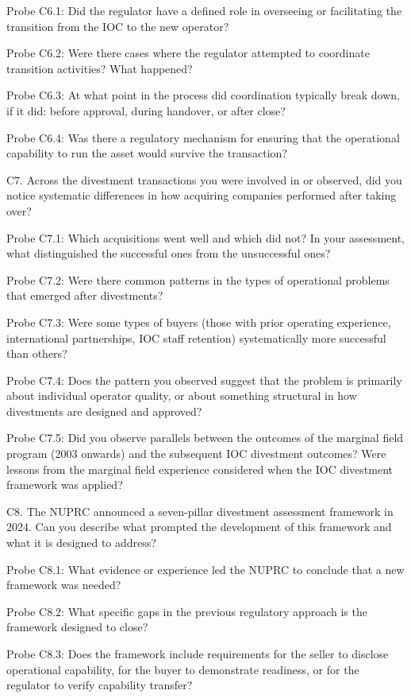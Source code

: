 Probe C6.1: Did the regulator have a defined role in overseeing or
facilitating the transition from the IOC to the new operator?

Probe C6.2: Were there cases where the regulator attempted to coordinate
transition activities? What happened?

Probe C6.3: At what point in the process did coordination typically
break down, if it did: before approval, during handover, or after close?

Probe C6.4: Was there a regulatory mechanism for ensuring that the
operational capability to run the asset would survive the transaction?

C7. Across the divestment transactions you were involved in or observed,
did you notice systematic differences in how acquiring companies
performed after taking over?

Probe C7.1: Which acquisitions went well and which did not? In your
assessment, what distinguished the successful ones from the unsuccessful
ones?

Probe C7.2: Were there common patterns in the types of operational
problems that emerged after divestments?

Probe C7.3: Were some types of buyers (those with prior operating
experience, international partnerships, IOC staff retention)
systematically more successful than others?

Probe C7.4: Does the pattern you observed suggest that the problem is
primarily about individual operator quality, or about something
structural in how divestments are designed and approved?

Probe C7.5: Did you observe parallels between the outcomes of the
marginal field program (2003 onwards) and the subsequent IOC divestment
outcomes? Were lessons from the marginal field experience considered
when the IOC divestment framework was applied?

C8. The NUPRC announced a seven-pillar divestment assessment framework
in 2024. Can you describe what prompted the development of this
framework and what it is designed to address?

Probe C8.1: What evidence or experience led the NUPRC to conclude that a
new framework was needed?

Probe C8.2: What specific gaps in the previous regulatory approach is
the framework designed to close?

Probe C8.3: Does the framework include requirements for the seller to
disclose operational capability, for the buyer to demonstrate readiness,
or for the regulator to verify capability transfer?

